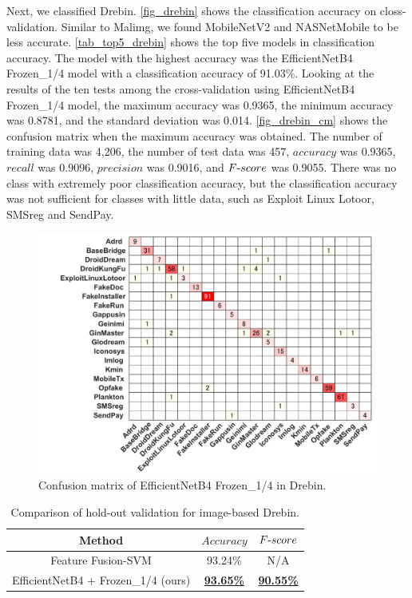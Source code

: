 \documentclass[conference]{IEEEtran}
\begin{document}
Next, we classified Drebin. \autoref{fig_drebin} shows the classification accuracy on closs-validation. 
Similar to Malimg, we found MobileNetV2 and NASNetMobile to be less accurate.
\autoref{tab_top5_drebin} shows the top five models in classification accuracy. 
The model with the highest accuracy was the EfficientNetB4 Frozen\_1/4 model with a classification accuracy of 91.03\%.
Looking at the results of the ten tests among the cross-validation using EfficientNetB4 Frozen\_1/4 model, the maximum accuracy was 0.9365, the minimum accuracy was 0.8781, and the standard deviation was 0.014. 
\autoref{fig_drebin_cm} shows the confusion matrix when the maximum accuracy was obtained. The number of training data was 4,206, the number of test data was 457, $accuracy$ was 0.9365, $recall$ was 0.9096, $precision$ was 0.9016, and $F\mathchar`-score$ was 0.9055. 
There was no class with extremely poor classification accuracy, but the classification accuracy was not sufficient for classes with little data, such as Exploit Linux Lotoor, SMSreg and SendPay.

\begin{figure}[t]
	\centering
	\includegraphics[width=\linewidth,clip]{Drebin_EfficientNetB4_5th.pdf}
	\caption{Confusion matrix of EfficientNetB4 Frozen\_1/4 in Drebin.}
	\label{fig_drebin_cm}
\end{figure}

\begin{table}[t]
	\caption{Comparison of hold-out validation for image-based Drebin.}
	\label{tab_comparison_drebin}
	\centering
	\begin{tabular}{ccc}
		\toprule
		Method & $Accuracy$ & $F\mathchar`-score$\\
		\midrule
		Feature Fusion-SVM \cite{9461194} & 93.24\% & N/A\\
		EfficientNetB4 + Frozen\_1/4 (ours) & \textbf{\underline{93.65\%}} & \textbf{\underline{90.55\%}} \\
		\bottomrule
	\end{tabular}
\end{table}
\end{document}
